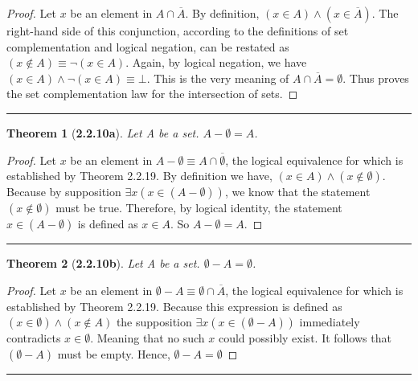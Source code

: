 \documentclass[a4paper, 12pt]{article}
\theoremstyle{plain}
\newtheorem*{theorem*}{Theorem}
\begin{document}
\begin{proof}
    Let $x$ be an element in $A \cap \overline{A}$. By definition, 
    $(x \in A) \land (x \in \overline{A})$. The right-hand side of this conjunction, according to the 
    definitions of set complementation and logical negation, can be restated as 
    \newline $(x \notin A) \equiv \lnot (x \in A)$. Again, by logical negation, we have 
    \newline $(x \in A) \land \lnot (x \in A) \equiv \bot$. This is the very meaning of 
    $A \cap \overline{A} = \emptyset$. Thus proves the set complementation law for the intersection of 
    sets.
\end{proof}
\begin{center}
    \rule{5.4in}{1pt}
\end{center}


\begin{theorem*}[\textbf{2.2.10a}]
    Let A be a set. $A - \emptyset = A$.
\end{theorem*}

\begin{proof}
    Let $x$ be an element in $A - \emptyset \equiv A \cap \overline{\emptyset}$, the logical 
    equivalence for which is established by Theorem 2.2.19. By definition we have, 
    \newline $(x \in A) \land (x \notin \emptyset)$. Because by supposition 
    $\exists x (x \in (A - \emptyset))$, we know that the statement $(x \notin \emptyset)$ must 
    be true. Therefore, by logical identity, the statement $x \in (A - \emptyset)$ is defined 
    as $x \in A$. So $A - \emptyset = A.$
\end{proof}
\begin{center}
    \rule{5.4in}{1pt}
\end{center}


\begin{theorem*}[\textbf{2.2.10b}]
    Let A be a set. $\emptyset - A = \emptyset$.
\end{theorem*}

\begin{proof}
    Let $x$ be an element in $\emptyset - A \equiv \emptyset \cap \overline{A}$, the logical 
    equivalence for which is established by Theorem 2.2.19. Because this expression is defined 
    as $(x \in \emptyset) \land (x \notin A)$ the supposition 
    $\exists x (x \in (\emptyset - A))$ immediately contradicts $x \in \emptyset$. Meaning that 
    no such $x$ could possibly exist. It follows that $(\emptyset - A)$ must be empty. Hence, 
    $\emptyset - A = \emptyset$
\end{proof}
\begin{center}
    \rule{5.4in}{1pt}
\end{center}
\end{document}
